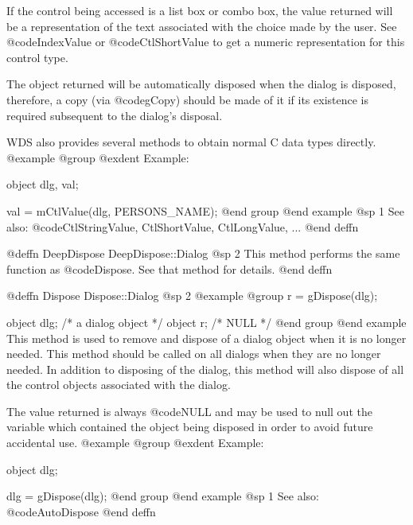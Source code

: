 If the control being accessed is a list box or combo box, the value
returned will be a representation of the text associated with the choice
made by the user.  See @code{IndexValue} or @code{CtlShortValue} to get
a numeric representation for this control type.

The object returned will be automatically disposed when the dialog is
disposed, therefore, a copy (via @code{gCopy}) should be made of it if
its existence is required subsequent to the dialog's disposal.

WDS also provides several methods to obtain normal C data types directly.
@example
@group
@exdent Example:

object  dlg, val;

val = mCtlValue(dlg, PERSONS_NAME);
@end group
@end example
@sp 1
See also:  @code{CtlStringValue, CtlShortValue, CtlLongValue, ...}
@end deffn












@deffn {DeepDispose} DeepDispose::Dialog
@sp 2
This method performs the same function as @code{Dispose}.  See that
method for details.
@end deffn









@deffn {Dispose} Dispose::Dialog
@sp 2
@example
@group
r = gDispose(dlg);

object  dlg;   /*  a dialog object   */
object  r;     /*  NULL              */
@end group
@end example
This method is used to remove and dispose of a dialog object when it
is no longer needed.  This method should be called on all dialogs
when they are no longer needed.  In addition to disposing of the dialog,
this method will also dispose of all the control objects associated
with the dialog.

The value returned is always @code{NULL} and may be used to null out
the variable which contained the object being disposed in order to
avoid future accidental use.
@example
@group
@exdent Example:

object  dlg;

dlg = gDispose(dlg);
@end group
@end example
@sp 1
See also:  @code{AutoDispose}
@end deffn










